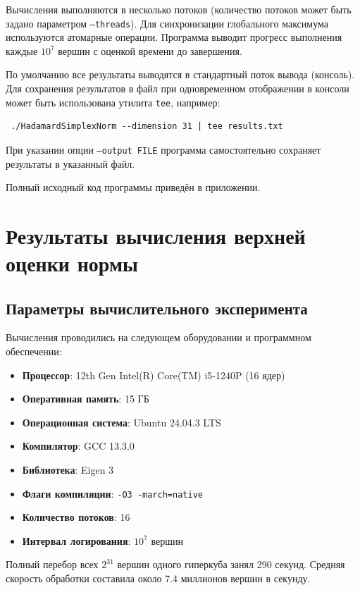 \documentclass[a4paper,12pt]{article}
\theoremstyle{indented}
\begin{document}
Вычисления выполняются в несколько потоков (количество потоков может быть задано параметром \texttt{--threads}). Для синхронизации глобального максимума используются атомарные операции. Программа выводит прогресс выполнения каждые $10^7$ вершин с оценкой времени до завершения.

По умолчанию все результаты выводятся в стандартный поток вывода (консоль). Для сохранения результатов в файл при одновременном отображении в консоли может быть использована утилита \texttt{tee}, например:
\begin{verbatim}
 ./HadamardSimplexNorm --dimension 31 | tee results.txt
\end{verbatim}
При указании опции \texttt{--output FILE} программа самостоятельно сохраняет результаты в указанный файл.

Полный исходный код программы приведён в приложении.
\section{Результаты вычисления верхней оценки нормы}

\subsection{Параметры вычислительного эксперимента}

Вычисления проводились на следующем оборудовании и программном обеспечении:

\begin{itemize}
    \item \textbf{Процессор}: 12th Gen Intel(R) Core(TM) i5-1240P (16 ядер)
    \item \textbf{Оперативная память}: 15 ГБ
    \item \textbf{Операционная система}: Ubuntu 24.04.3 LTS
    \item \textbf{Компилятор}: GCC 13.3.0
    \item \textbf{Библиотека}: Eigen 3
    \item \textbf{Флаги компиляции}: \texttt{-O3 -march=native}
    \item \textbf{Количество потоков}: 16
    \item \textbf{Интервал логирования}: $10^7$ вершин
\end{itemize}

Полный перебор всех $2^{31}$ вершин одного гиперкуба занял 290 секунд. Средняя скорость обработки составила около 7.4 миллионов вершин в секунду.
\end{document}
